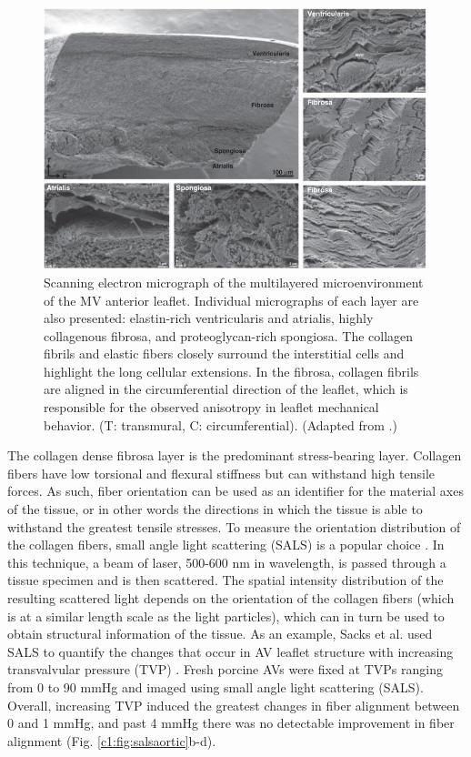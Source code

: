 \begin{figure}
\centering
\includegraphics[width=\textwidth]{Images/chapter1/valvelayers.jpg}
\caption{Scanning electron micrograph of the multilayered microenvironment of the MV anterior leaflet. Individual micrographs of each layer are also presented: elastin-rich ventricularis and atrialis, highly collagenous fibrosa, and proteoglycan-rich spongiosa. The collagen fibrils and elastic fibers closely surround the interstitial cells and highlight the long cellular extensions. In the fibrosa, collagen fibrils are aligned in the circumferential direction of the leaflet, which is responsible for the observed anisotropy in leaflet mechanical behavior. (T: transmural, C: circumferential). (Adapted from \cite{salma_heart_2016}.)}
\label{fig:valvelayers}
\end{figure}
   




    The collagen dense fibrosa layer is the predominant stress-bearing layer. Collagen fibers have low torsional and flexural stiffness but can withstand high tensile forces. As such, fiber orientation can be used as an identifier for the material axes of the tissue, or in other words the directions in which the tissue is able to withstand the greatest tensile stresses. To measure the orientation distribution of the collagen fibers, small angle light scattering (SALS) is a popular choice \cite{sacks_small_1997}. In this technique, a beam of laser, 500-600 nm in wavelength, is passed through a tissue specimen and is then scattered. The spatial intensity distribution of the resulting scattered light depends on the orientation of the collagen fibers (which is at a similar length scale as the light particles), which can in turn be used to obtain structural information of the tissue. As an example, Sacks et al. used SALS to quantify the changes that occur in AV leaflet structure with increasing transvalvular pressure (TVP) \cite{sacks_aortic_1998}.  Fresh porcine AVs were fixed at TVPs ranging from 0 to 90 mmHg and imaged using small angle light scattering (SALS). Overall, increasing TVP induced the greatest changes in fiber alignment between 0 and 1 mmHg, and past 4 mmHg there was no detectable improvement in fiber alignment (Fig. \ref{c1:fig:salsaortic}b-d). 
    
